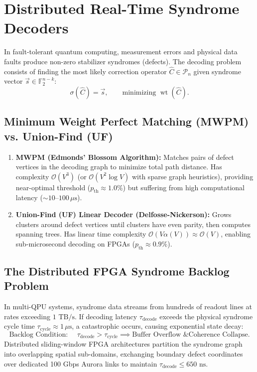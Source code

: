 \section{Distributed Real-Time Syndrome Decoders}
\label{sec:distributed_decoders}

In fault-tolerant quantum computing, measurement errors and physical data faults produce non-zero stabilizer syndromes (defects). The decoding problem consists of finding the most likely correction operator $\hat{C} \in \mathcal{P}_n$ given syndrome vector $\vec{s} \in \mathbb{F}_2^{n-k}$:
\begin{equation}
    \sigma(\hat{C}) = \vec{s}, \qquad \text{minimizing } \operatorname{wt}(\hat{C}).
\end{equation}

\subsection{Minimum Weight Perfect Matching (MWPM) vs. Union-Find (UF)}
\begin{enumerate}
    \item \textbf{MWPM (Edmonds' Blossom Algorithm):} Matches pairs of defect vertices in the decoding graph to minimize total path distance. Has complexity $\mathcal{O}(V^3)$ (or $\mathcal{O}(V^2 \log V)$ with sparse graph heuristics), providing near-optimal threshold ($p_{\text{th}} \approx 1.0\%$) but suffering from high computational latency ($\sim 10\text{--}100\,\mu\text{s}$).
    \item \textbf{Union-Find (UF) Linear Decoder (Delfosse-Nickerson):} Grows clusters around defect vertices until clusters have even parity, then computes spanning trees. Has linear time complexity $\mathcal{O}(V \alpha(V)) \approx \mathcal{O}(V)$, enabling sub-microsecond decoding on FPGAs ($p_{\text{th}} \approx 0.9\%$).
\end{enumerate}

\subsection{The Distributed FPGA Syndrome Backlog Problem}
In multi-QPU systems, syndrome data streams from hundreds of readout lines at rates exceeding $1\text{ TB/s}$. If decoding latency $\tau_{\text{decode}}$ exceeds the physical syndrome cycle time $\tau_{\text{cycle}} \approx 1\,\mu\text{s}$, a catastrophic  occurs, causing exponential state decay:
\begin{equation}
    \text{Backlog Condition: } \quad \tau_{\text{decode}} > \tau_{\text{cycle}} \implies \text{Buffer Overflow \& Coherence Collapse}.
\end{equation}
Distributed sliding-window FPGA architectures partition the syndrome graph into overlapping spatial sub-domains, exchanging boundary defect coordinates over dedicated 100 Gbps Aurora links to maintain $\tau_{\text{decode}} \le 650\text{ ns}$.

